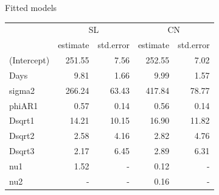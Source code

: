 
\begin{frame}[fragile]{Fitted models}
\protect\hypertarget{fitted-models}{}

\scriptsize

\begin{Shaded}
\begin{Highlighting}[]
\NormalTok{(}\OperatorTok{$}\NormalTok{,}\OperatorTok{$}\NormalTok{)}
\NormalTok{(}\OperatorTok{$}\OperatorTok{$}
\end{Highlighting}
\end{Shaded}

\begin{longtable}[]{@{}lrrrr@{}}
\toprule
& \multicolumn{2}{c}{{SL}} &\multicolumn{2}{c}{{CN}}\tabularnewline
& estimate & std.error & estimate & std.error\tabularnewline
\midrule
\endhead
(Intercept) & 251.55 & 7.56 & 252.55 & 7.02\tabularnewline
Days & 9.81 & 1.66 & 9.99 & 1.57\tabularnewline
sigma2 & 266.24 & 63.43 & 417.84 & 78.77\tabularnewline
phiAR1 & 0.57 & 0.14 & 0.56 & 0.14\tabularnewline
Dsqrt1 & 14.21 & 10.15 & 16.90 & 11.82\tabularnewline
Dsqrt2 & 2.58 & 4.16 & 2.82 & 4.76\tabularnewline
Dsqrt3 & 2.17 & 6.45 & 2.89 & 6.31\tabularnewline
nu1 & 1.52 & - & 0.12 & -\tabularnewline
nu2& - & - & 0.16 & -\tabularnewline
\bottomrule
\end{longtable}

\end{frame}


